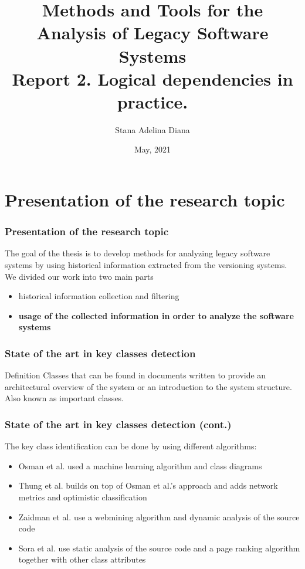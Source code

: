 \documentclass{beamer}
\title[Pres]{Methods and Tools for the Analysis of Legacy Software
Systems\\
Report 2. Logical dependencies in practice.
 }
\author{Stana Adelina Diana}
\institute{Computer Science and Engineering Department\\
"Politehnica" University of Timisoara}
\date{May, 2021}
\begin{document}
\begin{frame}
  \titlepage
\end{frame}

\section{Presentation of the research topic}
 \begin{frame}
\frametitle{Presentation of the research topic}
The goal of the thesis is to develop methods for analyzing legacy software systems by using historical information extracted from the versioning systems.
We divided our work into two main parts

\begin{itemize}
\item historical information collection and filtering
\item \textbf{usage of the collected information in order to analyze the software systems}
\end{itemize}

\end{frame}


 \begin{frame}
\frametitle{State of the art in key classes detection}
\begin{block}{Definition}
 Classes that can be found in documents written to provide an architectural overview of the system or an introduction to the system structure. Also known as important classes.
\end{block}

\end{frame}


 \begin{frame}
\frametitle{State of the art in key classes detection (cont.)}
 The key class identification can be done by using different algorithms:
\begin{itemize}
\item Osman et al. used a machine learning algorithm and class diagrams  \cite{6676885}
\item Thung et al. builds on top of Osman et al.’s approach and adds network metrics and optimistic classification \cite{rocclasification}
\item Zaidman et al. use a webmining algorithm and dynamic analysis of the source code \cite{ZaidmanJurnal}
\item Sora et al. use static analysis of the source code and a page ranking algorithm together with other class attributes \cite{Finding-key-classes}
\end{itemize}

\end{frame}
\end{document}
